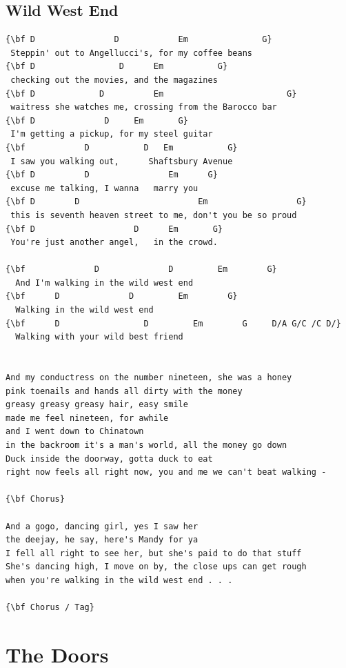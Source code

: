 \documentclass[a4paper]{article}
\begin{document}
\subsection{Wild West End}
\begin{Verbatim}[commandchars=\\\{\}]
{\bf D                D            Em               G}
 Steppin' out to Angellucci's, for my coffee beans
{\bf D                 D      Em           G}
 checking out the movies, and the magazines
{\bf D             D          Em                         G}
 waitress she watches me, crossing from the Barocco bar
{\bf D              D     Em       G}
 I'm getting a pickup, for my steel guitar
{\bf            D           D   Em           G}
 I saw you walking out,      Shaftsbury Avenue
{\bf D          D                Em      G}
 excuse me talking, I wanna   marry you
{\bf D        D                        Em                  G}
 this is seventh heaven street to me, don't you be so proud
{\bf D                    D      Em       G}
 You're just another angel,   in the crowd. 

{\bf              D              D         Em        G}
  And I'm walking in the wild west end
{\bf      D              D         Em        G}
  Walking in the wild west end
{\bf      D                 D         Em        G     D/A G/C /C D/}
  Walking with your wild best friend


And my conductress on the number nineteen, she was a honey
pink toenails and hands all dirty with the money
greasy greasy greasy hair, easy smile
made me feel nineteen, for awhile
and I went down to Chinatown
in the backroom it's a man's world, all the money go down
Duck inside the doorway, gotta duck to eat
right now feels all right now, you and me we can't beat walking -

{\bf Chorus}

And a gogo, dancing girl, yes I saw her
the deejay, he say, here's Mandy for ya
I fell all right to see her, but she's paid to do that stuff
She's dancing high, I move on by, the close ups can get rough
when you're walking in the wild west end . . .

{\bf Chorus / Tag}

\end{Verbatim}
\newpage
\section{The Doors}
\end{document}
